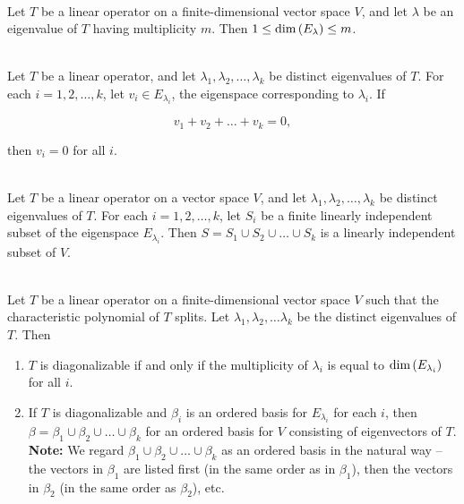\begin{theorem}
	\hfill\\
	Let $T$ be a linear operator on a finite-dimensional vector space $V$, and let $\lambda$ be an eigenvalue of $T$ having multiplicity $m$. Then $1 \leq \text{dim}\left(E_\lambda\right) \leq m$.
\end{theorem}

\begin{lemma}
	\hfill\\
	Let $T$ be a linear operator, and let $\lambda_1, \lambda_2, \dots, \lambda_k$ be distinct eigenvalues of $T$. For each $i=1, 2, \dots, k$, let $v_i \in E_{\lambda_i}$, the eigenspace corresponding to $\lambda_i$. If

	\[v_1 + v_2 + \dots + v_k = 0,\]

	then $v_i = 0$ for all $i$.
\end{lemma}

\begin{theorem}
	\hfill\\
	Let $T$ be a linear operator on a vector space $V$, and let $\lambda_1, \lambda_2, \dots, \lambda_k$ be distinct eigenvalues of $T$. For each $i = 1, 2, \dots, k$, let $S_i$ be a finite linearly independent subset of the eigenspace $E_{\lambda_i}$. Then $S = S_1 \cup S_2 \cup \dots \cup S_k$ is a linearly independent subset of $V$.
\end{theorem}

\begin{theorem}
	\hfill\\
	Let $T$ be a linear operator on a finite-dimensional vector space $V$ such that the characteristic polynomial of $T$ splits. Let $\lambda_1, \lambda_2, \dots \lambda_k$ be the distinct eigenvalues of $T$. Then

	\begin{enumerate}
		\item $T$ is diagonalizable if and only if the multiplicity of $\lambda_i$ is equal to $\text{dim}\left(E_{\lambda_i}\right)$ for all $i$.
		\item If $T$ is diagonalizable and $\beta_i$ is an ordered basis for $E_{\lambda_i}$ for each $i$, then $\beta = \beta_1 \cup \beta_2 \cup \dots \cup \beta_k$ for an ordered basis for $V$ consisting of eigenvectors of $T$.\\

		      \textbf{Note:} We regard $\beta_1 \cup \beta_2 \cup \dots \cup \beta_k$ as an ordered basis in the natural way -- the vectors in $\beta_1$ are listed first (in the same order as in $\beta_1$), then the vectors in $\beta_2$ (in the same order as $\beta_2$), etc.
	\end{enumerate}
\end{theorem}

